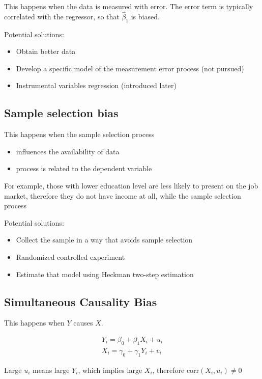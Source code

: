 \documentclass{article}
\begin{document}
This happens when the data is measured with error.
The error term is typically correlated with the regressor, so that $\hat{\beta}_1$ is biased.

Potential solutions:
\begin{itemize}
	\item Obtain better data
	\item Develop a specific model of the measurement error process (not pursued)
	\item Instrumental variables regression (introduced later)
\end{itemize}

\subsection{Sample selection bias}

This happens when the sample selection process
\begin{itemize}
	\item influences the availability of data
	\item process is related to the dependent variable
\end{itemize}

For example, those with lower education level are less likely to present on the job market,
therefore they do not have income at all, while the sample selection process

Potential solutions:
\begin{itemize}
	\item Collect the sample in a way that avoids sample selection
	\item Randomized controlled experiment
	\item Estimate that model using Heckman two-step estimation
\end{itemize}

\subsection{Simultaneous Causality Bias}

This happens when $Y$ causes $X$.

\[
	\begin{aligned}
		Y_i = \beta_0 + \beta_1 X_i + u_i\\
		X_i = \gamma_0 + \gamma_1 Y_i + v_i
	\end{aligned}
\]

Large $u_i$ means large $Y_i$, which implies large $X_i$, therefore $\text{corr}(X_i, u_i) \neq 0$
\end{document}
